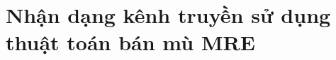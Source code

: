 \clearpage
{}

\setcounter{chapter}{1}
\chapter[{NHẬN DẠNG KÊNH TRUYỀN SỬ DỤNG THUẬT TOÁN BÁN MÙ MRE}]{Nhận dạng kênh truyền sử dụng thuật toán bán mù MRE}
